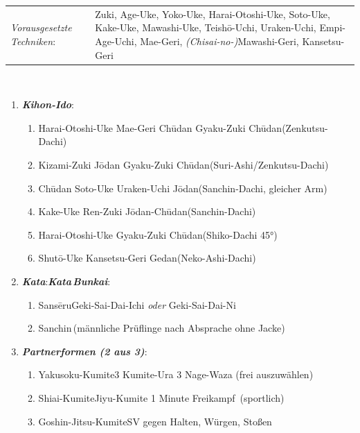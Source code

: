 \documentclass[a5paper,landscape,DIV=calc,11pt,notitlepage]{scrartcl}
\newcommand{\bull}{\,\textbullet\,}
\begin{document}
\pagebreak
\begin{tcolorbox}[colback=white,colframe=BRBELT,coltitle=white,title=1. Kyu: Braun]
	\renewcommand{\labelenumi}{\alph{enumi}.)}
	\renewcommand{\labelenumii}{\arabic*.}
	{\scriptsize 
		\begin{tabularx}{\textwidth}{lX}
			\textit{Vorausgesetzte Techniken}:& Zuki, Age-Uke, Yoko-Uke, Harai-Otoshi-Uke, Soto-Uke, Kake-Uke, Mawashi-Uke, Teish\={o}-Uchi, Uraken-Uchi, \mbox{Empi-Age-Uchi}, Mae-Geri, \textit{(Chisai-no-)}Mawashi-Geri, Kansetsu-Geri
		\end{tabularx}\\\vspace{12pt}}
	\begin{enumerate}[nosep]
		\item \textit{\textbf{Kihon-Ido}}:
		\begin{enumerate}[nosep]
			\item Harai-Otoshi-Uke\bull Mae-Geri Ch\={u}dan\bull Gyaku-Zuki Ch\={u}dan\tabto{280pt}(Zenkutsu-Dachi)
			\item Kizami-Zuki J\={o}dan\bull Gyaku-Zuki Ch\={u}dan\tabto{280pt}(Suri-Ashi/Zenkutsu-Dachi)
			\item Ch\={u}dan Soto-Uke\bull Uraken-Uchi J\={o}dan\tabto{280pt}(Sanchin-Dachi, gleicher Arm)
			\item Kake-Uke\bull Ren-Zuki J\={o}dan-Ch\={u}dan\tabto{280pt}(Sanchin-Dachi)
			\item Harai-Otoshi-Uke\bull Gyaku-Zuki Ch\={u}dan\tabto{280pt}(Shiko-Dachi 45°)
			\item Shut\={o}-Uke\bull Kansetsu-Geri Gedan\tabto{280pt}(Neko-Ashi-Dachi)
		\end{enumerate}\vspace{24pt}
		\item \textit{\textbf{Kata}}:\tabto{200pt}\textit{\textbf{Kata\,Bunkai}}:
		\begin{enumerate}[nosep]
			\item Sans\={e}ru\tabto{200pt}Geki-Sai-Dai-Ichi \textit{oder} Geki-Sai-Dai-Ni
			\item Sanchin\,{\scriptsize (männliche Prüflinge nach Absprache ohne Jacke)}
		\end{enumerate}\vspace{24pt}
		\item \textit{\textbf{Partnerformen (2 aus 3)}}:
		\begin{enumerate}[nosep]
			\item Yakusoku-Kumite\tabto{200pt}3 Kumite-Ura\bull 3 Nage-Waza (frei auszuwählen)
			\item Shiai-Kumite\tabto{200pt}Jiyu-Kumite 1 Minute \frqq Freikampf\flqq~(sportlich)
			\item Goshin-Jitsu-Kumite\tabto{200pt}SV gegen Halten, Würgen, Stoßen
		\end{enumerate}
	\end{enumerate}
\end{tcolorbox}
\end{document}
